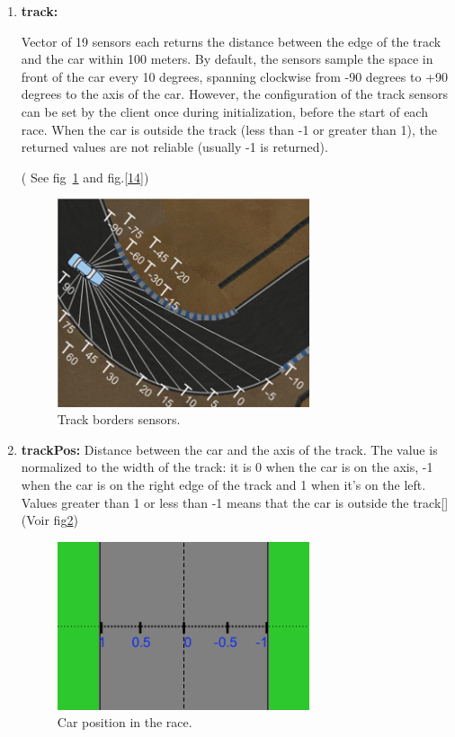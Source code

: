 \documentclass{llncs}
\begin{document}
\begin{enumerate}
	
	\item \textbf{track:}   
	
	Vector of 19 sensors each returns the distance between the edge of the track and the car within 100 meters. By default, the sensors sample the space in front of the car every 10 degrees, spanning clockwise from -90 degrees to +90 degrees to the axis of the car. However, the configuration of the track sensors can be set by the client once during initialization, before the start of each race. When the car is outside the track (less than -1 or greater than 1), the returned values are not reliable (usually -1 is returned).
	
	( See fig~\ref{tab16} and fig.\ref{14})
	\begin{figure}[h!]
		\centering
		\includegraphics[width=0.7\textwidth]{fig/track.png}
		
		\begin{minipage}{10cm}
			\centering
			\caption{\footnotesize Track borders sensors.}
			\label{tab16}
		\end{minipage} 
		
		
	\end{figure}
	\newpage
	\item \textbf{trackPos:} 		
	Distance between the car and the axis of the track. The value is normalized to the width of the track: it is 0 when the car is on the axis, -1 when the car is on the right edge of the track and 1 when it's on the left. Values greater than 1 or less than -1 means that the car is outside the track[\cite{torcs2}](Voir fig\ref{tab17})
	\begin{figure}[h!]
		\centering
		\includegraphics[width=0.7\textwidth]{fig/position.png}
		\begin{minipage}{10cm}
			\centering
			\caption{\footnotesize Car position in the race.}
			\label{tab17}
		\end{minipage} 


\end{figure}
\end{enumerate}
\end{document}
